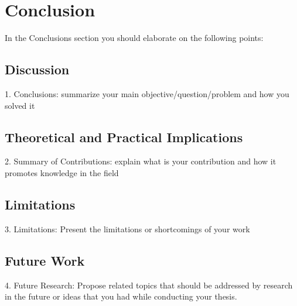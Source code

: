 \chapter{Conclusion}
\label{sec:Conclusion}

In the Conclusions section you should elaborate on the following points:
\section{Discussion}
1. Conclusions: summarize your main objective/question/problem and how you solved it
\section{Theoretical and Practical Implications}
2. Summary of Contributions: explain what is your contribution and how it promotes knowledge in the field
\section{Limitations}
3. Limitations: Present the limitations or shortcomings of your work
\section{Future Work}
4. Future Research: Propose related topics that should be addressed by research in the future or ideas that you had while conducting your thesis. 

